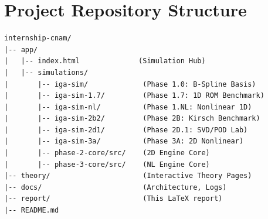 \section{Project Repository Structure}

\begin{lstlisting}[language={}, caption={Repository file tree.}]
internship-cnam/
|-- app/
|   |-- index.html              (Simulation Hub)
|   |-- simulations/
|       |-- iga-sim/             (Phase 1.0: B-Spline Basis)
|       |-- iga-sim-1.7/         (Phase 1.7: 1D ROM Benchmark)
|       |-- iga-sim-nl/          (Phase 1.NL: Nonlinear 1D)
|       |-- iga-sim-2b2/         (Phase 2B: Kirsch Benchmark)
|       |-- iga-sim-2d1/         (Phase 2D.1: SVD/POD Lab)
|       |-- iga-sim-3a/          (Phase 3A: 2D Nonlinear)
|       |-- phase-2-core/src/    (2D Engine Core)
|       |-- phase-3-core/src/    (NL Engine Core)
|-- theory/                      (Interactive Theory Pages)
|-- docs/                        (Architecture, Logs)
|-- report/                      (This LaTeX report)
|-- README.md
\end{lstlisting}
